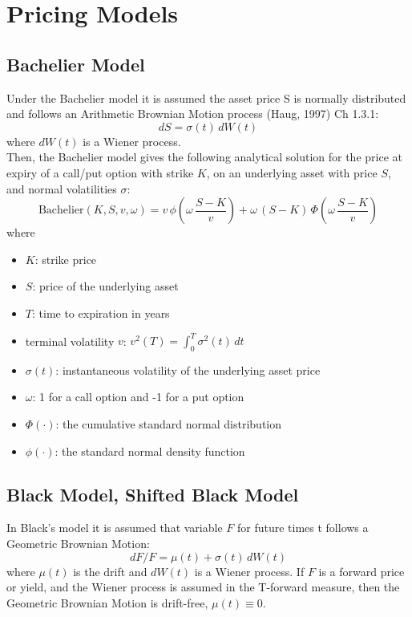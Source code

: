 \section{Pricing Models}
\label{sec:models}

\subsection{Bachelier Model}
\label{models:bachelier}

Under the Bachelier model it is assumed the asset price S is normally distributed 
and follows an Arithmetic Brownian Motion process (Haug, 1997) Ch 1.3.1:
$$
dS=\sigma(t)\,dW(t)
$$
where $dW(t)$ is a Wiener process. \\

Then, the Bachelier model gives the following analytical solution for the price 
at expiry of a call/put option with strike $K$, on an underlying asset with price $S$, 
and normal volatilities $\sigma$:
$$
\mbox{Bachelier}(K,S,v,\omega)=v\, \phi\left(\omega\,\frac{S-K}{v}\right)
+\omega\, (S-K) \,\Phi\left(\omega\,\frac{S-K}{v}\right)
$$
where
\begin{itemize}
\item $K$: strike price
\item $S$: price of the underlying asset
\item $T$: time to expiration in years
\item  terminal volatility $v$: $\displaystyle v^2(T)=\int_0^T\sigma^2(t)\,dt$ 
\item $\sigma(t)$: instantaneous volatility of the underlying asset price
\item $\omega$: 1 for a call option and -1 for a put option
\item $\Phi(\cdot)$: the cumulative standard normal distribution
\item $\phi(\cdot)$: the standard normal density function
\end{itemize}

\subsection{Black Model, Shifted Black Model}
\label{models:black}

In Black's model it is assumed that variable $F$ for future times t follows a Geometric 
Brownian Motion:
$$
dF/F=\mu(t)+\sigma(t)\,dW(t)
$$
where $\mu(t)$ is the drift and $dW(t)$ is a Wiener process. If $F$ is a forward price 
or yield, and the Wiener process is assumed in the T-forward measure, then the Geometric 
Brownian Motion is drift-free, $\mu(t)\equiv 0$.

